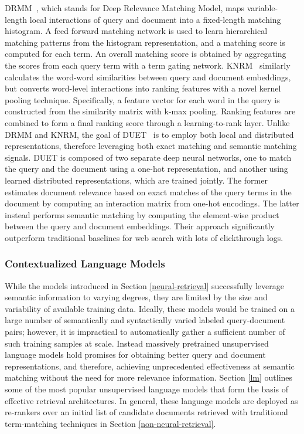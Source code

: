 DRMM~\cite{guo2017drmm}, which stands for Deep Relevance Matching Model, maps variable-length local interactions of query and document into a fixed-length matching histogram.
A feed forward matching network is used to learn hierarchical matching patterns from the histogram representation, and a matching score is computed for each term.
An overall matching score is obtained by aggregating the scores from each query term with a term gating network.
KNRM~\cite{xiong2017knrm} similarly calculates the word-word similarities between query and document embeddings, but converts word-level interactions into ranking features with a novel kernel pooling technique.
Specifically, a feature vector for each word in the query is constructed from the similarity matrix with k-max pooling.
Ranking features are combined to form a final ranking score through a learning-to-rank layer.
Unlike DRMM and KNRM, the goal of DUET~\cite{mitra2017learning} is to employ both local and distributed representations, therefore leveraging both exact matching and semantic matching signals.
DUET is composed of two separate deep neural networks, one to match the query and the document using a one-hot representation, and another using learned distributed representations, which are trained jointly.
The former estimates document relevance based on exact matches of the query terms in the document by computing an interaction matrix from one-hot encodings.
The latter instead performs semantic matching by computing the element-wise product between the query and document embeddings.
Their approach significantly outperform traditional baselines for web search with lots of clickthrough logs.

\subsubsection{Contextualized Language Models}

While the models introduced in Section \ref{neural-retrieval} successfully leverage semantic information to varying degrees, they are limited by the size and variability of available training data.
Ideally, these models would be trained on a large number of semantically and syntactically varied labeled query-document pairs; however, it is impractical to automatically gather a sufficient number of such training samples at scale.
Instead massively pretrained unsupervised language models hold promises for obtaining better query and document representations, and therefore, achieving unprecedented effectiveness at semantic matching without the need for more relevance information.
Section \ref{lm} outlines some of the most popular unsupervised language models that form the basis of effective retrieval architectures.
In general, these language models are deployed as re-rankers over an initial list of candidate documents retrieved with traditional term-matching techniques in Section \ref{non-neural-retrieval}.


